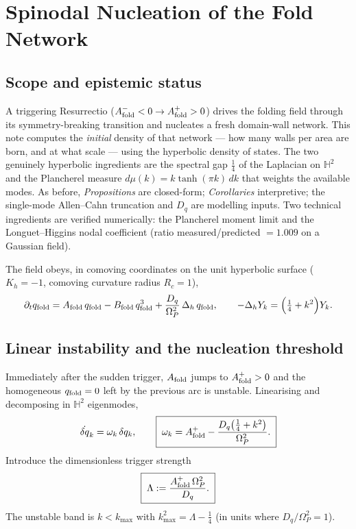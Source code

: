 \documentclass[11pt,a4paper,oneside]{book}
\newcommand{\Op}{\Omega_P}
\newcommand{\qf}{q_{\rm fold}}
\newcommand{\Af}{A_{\rm fold}}
\newcommand{\Bf}{B_{\rm fold}}
\newcommand{\Hh}{\mathbb{H}^2}
\newcommand{\laph}{\Delta_h}
\newcommand{\Dq}{D_q}
\newcommand{\kmax}{k_{\max}}
\newcommand{\Lam}{\Lambda}
\newcommand{\Rc}{R_c}
\theoremstyle{plain}
\theoremstyle{definition}
\theoremstyle{remark}
\begin{document}
\chapter{Spinodal Nucleation of the Fold Network}

\section*{Scope and epistemic status}
A triggering Resurrectio ($\Af^-<0\to\Af^+>0$) drives the folding field through its symmetry-breaking
transition and nucleates a fresh domain-wall network. This note computes the \emph{initial} density of
that network --- how many walls per area are born, and at what scale --- using the hyperbolic density of
states. The two genuinely hyperbolic ingredients are the spectral gap $\tfrac14$ of the Laplacian on
$\Hh$ and the Plancherel measure $d\mu(k)=k\tanh(\pi k)\,dk$ that weights the available modes. As before,
\emph{Propositions} are closed-form; \emph{Corollaries} interpretive; the single-mode Allen--Cahn
truncation and $\Dq$ are modelling inputs. Two technical ingredients are verified numerically: the
Plancherel moment limit and the Longuet--Higgins nodal coefficient (ratio measured/predicted $=1.009$ on
a Gaussian field).

The field obeys, in comoving coordinates on the unit hyperbolic surface ($K_h=-1$, comoving curvature
radius $\Rc=1$),
\begin{equation}
\partial_t\qf=\Af\,\qf-\Bf\,\qf^{3}+\frac{\Dq}{\Op^{2}}\,\laph\,\qf,
\qquad
-\laph Y_k=\Bigl(\tfrac14+k^2\Bigr)Y_k .
\end{equation}

\section{Linear instability and the nucleation threshold}

Immediately after the sudden trigger, $\Af$ jumps to $\Af^+>0$ and the homogeneous $\qf=0$ left by the
previous arc is unstable. Linearising and decomposing in $\Hh$ eigenmodes,
\begin{equation}
\dot{\delta q}_k=\omega_k\,\delta q_k,
\qquad
\boxed{\;\omega_k=\Af^+-\frac{\Dq\bigl(\tfrac14+k^2\bigr)}{\Op^{2}} .\;}
\end{equation}
Introduce the dimensionless trigger strength
\begin{equation}
\boxed{\;\Lam:=\frac{\Af^+\,\Op^{2}}{\Dq}.\;}
\end{equation}
The unstable band is $k<\kmax$ with $\kmax^2=\Lam-\tfrac14$ (in units where $\Dq/\Op^2=1$).
\end{document}
